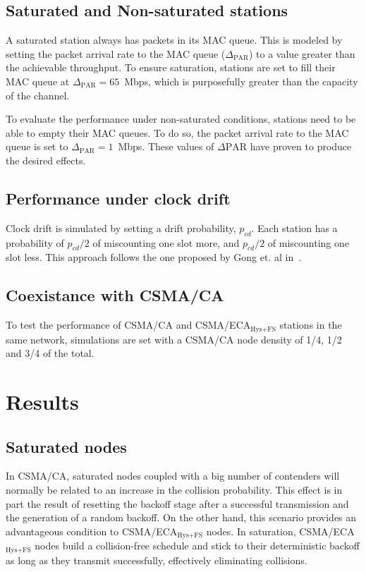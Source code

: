 \documentclass[a4paper,journal]{IEEEtran}
\begin{document}
	\subsection{Saturated and Non-saturated stations}\label{unsaturation}
	A saturated station always has packets in its MAC queue. This is modeled by setting the packet arrival rate to the MAC queue ($\Delta_{\text{PAR}}$) to a value greater than the achievable throughput. To ensure saturation, stations are set to fill their MAC queue at $\Delta_{\text{PAR}}=65$~Mbps, which is purposefully greater than the capacity of the channel.
	
	To evaluate the performance under non-saturated conditions, stations need to be able to empty their MAC queues. To do so, the packet arrival rate to the MAC queue is set to $\Delta_{\text{PAR}}=1$~Mbps. These values of $\Delta{\text{PAR}}$ have proven to produce the desired effects.
	
	\subsection{Performance under clock drift}
	Clock drift is simulated by setting a drift probability, $p_{cd}$. Each station has a probability of $p_{cd}/2$ of miscounting one slot more, and $p_{cd}/2$ of miscounting one slot less. This approach follows the one proposed by Gong et. al in~\cite{slotDrift}.
	
	\subsection{Coexistance with CSMA/CA}\label{coexistence}
	To test the performance of CSMA/CA and CSMA/ECA$_{\text{Hys+FS}}$ stations in the same network, simulations are set with a CSMA/CA node density of 1/4, 1/2 and 3/4 of the total.
	

\section{Results}\label{results}

	\subsection{Saturated nodes}\label{resultsSaturated}
	In CSMA/CA, saturated nodes coupled with a big number of contenders will normally be related to an increase in the collision probability. This effect is in part the result of resetting the backoff stage after a successful transmission and the generation of a random backoff. On the other hand, this scenario provides an advantageous condition to CSMA/ECA$_{\text{Hys+FS}}$ nodes. In saturation, CSMA/ECA$_{\text{Hys+FS}}$ nodes build a collision-free schedule and stick to their deterministic backoff as long as they transmit successfully, effectively eliminating collisions.
	
\end{document}
